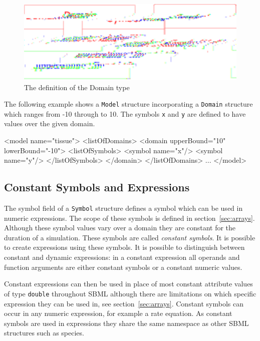 \documentclass{cekarticle}
\begin{document}
\begin{figure}[h]
  \vspace*{8pt}
  \centering
  \includegraphics[scale = 0.7]{domain}
  \caption{The definition of the Domain type}
  \label{fig:domain}
\end{figure}

The following example shows a \texttt{Model} structure
incorporating a \texttt{Domain} structure which ranges from -10
through to 10.  The symbols \texttt{x} and \texttt{y} are defined
to have values over the given domain.

\begin{example}
<model name="tissue">
    <listOfDomains>
        <domain upperBound="10" lowerBound="-10">
            <listOfSymbols>
                <symbol name="x"/>
                <symbol name="y"/>
            </listOfSymbols>
        </domain>
    </listOfDomains>
    ...
</model>
\end{example}

\subsection{Constant Symbols and Expressions}
\label{sec:constantExpressions}

The symbol field of a \texttt{Symbol} structure defines a symbol
which can be used in numeric expressions.  The scope of these
symbols is defined in section~\ref{sec:arrays}. Although these
symbol values vary over a domain they are constant for the
duration of a simulation.  These symbols are called
\emph{constant symbols}. It is possible to create expressions
using these symbols. It is possible to distinguish between
constant and dynamic expressions: in a constant expression all
operands and function arguments are either constant symbols or a
constant numeric values.

Constant expressions can then be used in place of most constant
attribute values of type \texttt{double} throughout SBML although
there are limitations on which specific expression they can be
used in, see section~\ref{sec:arrays}. Constant symbols can occur
in any numeric expression, for example a rate equation. As
constant symbols are used in expressions they share the same
namespace as other SBML structures such as species.
\end{document}
